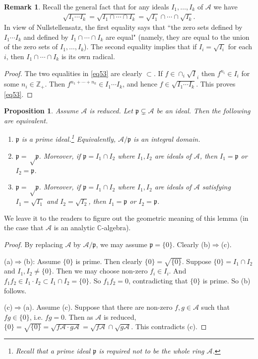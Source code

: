 \documentclass[12pt,b5paper,notitlepage]{report}
\theoremstyle{definition}
\newtheorem{rem}[df]{Remark}
\theoremstyle{plain}
\newtheorem{pp}[df]{Proposition}
\newcommand{\fk}{\mathfrak}
\newcommand{\mc}{\mathcal}
\newcommand{\pk}{\mathfrak p}
\newcommand{\Cbb}{\mathbb C}
\newcommand{\Zbb}{\mathbb Z}
\numberwithin{equation}{section}
\begin{document}
\begin{rem}\label{lb105}
Recall the general fact that for any ideals $I_1,\dots,I_k$ of $\mc A$ we have
\begin{gather}\label{eq53}
\sqrt{I_1\cdots I_k}=\sqrt{I_1\cap\cdots\cap I_k}=\sqrt{I_1}\cap\cdots\cap\sqrt{I_k}.
\end{gather}
In view of Nullstellensatz, the first equality says that ``the zero sets defined by $I_1\cdots I_k$ and defined by $I_1\cap \cdots\cap I_k$ are equal" (namely, they are equal to the union of the zero sets of $I_1,\dots,I_k$). The second equality implies that if $I_i=\sqrt{I_i}$ for each $i$, then $I_1\cap\cdots\cap I_k$ is its own radical.
\end{rem}


\begin{proof}
The two equalities in \eqref{eq53} are clearly $\subset$. If $f\in\cap_i\sqrt I_i$ then $f^{n_i}\in I_i$ for some $n_i\in\Zbb_+$. Then $f^{n_1+\cdots+n_k}\in I_1\cdots I_k$, and hence $f\in\sqrt{I_1\cdots I_k}$. This proves \eqref{eq53}.
\end{proof}

\begin{pp}\label{lb103}
Assume $\mc A$ is reduced. Let $\fk p\subsetneq\mc A$ be an ideal. Then the following are equivalent.
\begin{enumerate}[label=(\alph*)]
\item $\pk$ is a prime ideal.\footnote{Recall that a prime ideal $\pk$ is required not to be the whole ring $\mc A$.} Equivalently, $\mc A/\pk$ is an integral domain.
\item $\pk=\sqrt\pk$. Moreover, if $\pk=I_1\cap I_2$ where $I_1,I_2$ are ideals of $\mc A$, then $I_1=\pk$ or $I_2=\pk$.
\item $\pk=\sqrt\pk$.  Moreover, if $\pk=I_1\cap I_2$ where $I_1,I_2$ are ideals of $\mc A$ satisfying $I_1=\sqrt{I_1}$ and $I_2=\sqrt{I_2}$, then $I_1=\pk$ or $I_2=\pk$.
\end{enumerate}
\end{pp}

We leave it to the readers to figure out the geometric meaning of this lemma (in the case that $\mc A$ is an analytic $\Cbb$-algebra).

\begin{proof}
By replacing $\mc A$ by $\mc A/\pk$, we may assume $\pk=\{0\}$. Clearly (b)$\Rightarrow$(c).

(a)$\Rightarrow$(b): Assume $\{0\}$ is prime. Then clearly $\{0\}=\sqrt{\{0\}}$. Suppose $\{0\}=I_1\cap I_2$ and $I_1,I_2\neq\{0\}$. Then we may choose non-zero $f_i\in I_i$. And $f_1f_2\in I_1\cdot I_2\subset I_1\cap I_2=\{0\}$. So $f_1f_2=0$, contradicting that $\{0\}$ is prime. So (b) follows.

(c)$\Rightarrow$(a). Assume (c). Suppose that there are non-zero $f,g\in \mc A$ such that $fg\in\{0\}$, i.e. $fg=0$. Then as $\mc A$ is reduced, $\{0\}=\sqrt{\{0\}}=\sqrt{f\mc A\cdot g\mc A}=\sqrt{f\mc A}\cap\sqrt{g\mc A}$. This contradicts (c).
\end{proof}
\end{document}
